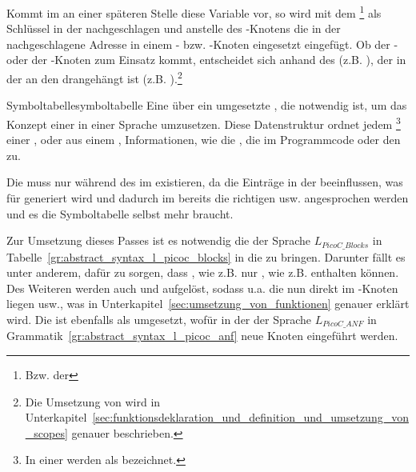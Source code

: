 Kommt im  an einer späteren Stelle diese Variable  vor, so wird mit dem \footnote{Bzw. der } als Schlüssel in der  nachgeschlagen und anstelle des -Knotens die in der  nachgeschlagene Adresse in einem - bzw. -Knoten eingesetzt eingefügt. Ob der - oder  der -Knoten zum Einsatz kommt, entscheidet sich anhand des  (z.B. ), der in der  an den  drangehängt ist (z.B. ).\footnote{Die Umsetzung von  wird in Unterkapitel~\ref{sec:funktionsdeklaration_und_definition_und_umsetzung_von_scopes} genauer beschrieben.}

\begin{Definition}{Symboltabelle}{symboltabelle}
  Eine über ein  umgesetzte , die notwendig ist, um das Konzept einer  in einer Sprache umzusetzen. Diese Datenstruktur ordnet jedem \footnote{In einer  werden  als  bezeichnet.} einer ,  oder  aus einem , Informationen, wie die , die  im Programmcode oder den  zu.

  Die  muss nur während des  im  existieren, da die Einträge in der  beeinflussen, was für  generiert wird und dadurch im  bereits die richtigen  usw. angesprochen werden und es die Symboltabelle selbst  mehr braucht.
\end{Definition}


Zur Umsetzung dieses Passes ist es notwendig die  der Sprache $L_{PicoC\_Blocks}$ in Tabelle~\ref{gr:abstract_syntax_l_picoc_blocks} in die  zu bringen. Darunter fällt es unter anderem, dafür zu sorgen, dass , wie z.B.  nur , wie z.B.  enthalten können. Des Weiteren werden auch  und  aufgelöst, sodass u.a. die   nun direkt im -Knoten liegen usw., was in Unterkapitel~\ref{sec:umsetzung_von_funktionen} genauer erklärt wird. Die  ist ebenfalls als  umgesetzt, wofür in der  der Sprache $L_{PicoC\_ANF}$ in Grammatik~\ref{gr:abstract_syntax_l_picoc_anf} neue Knoten eingeführt werden.

